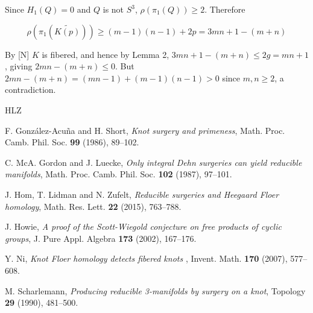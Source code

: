 \documentclass[12pt]{amsart}
\begin{document}
  Since $H_1(Q) = 0$ and $Q$ is not $S^3$,  $\rho(\pi_1(Q)) \ge 2$. Therefore

  $$\rho(\pi_1(\widetilde{K(p)})) \ge (m-1)(n-1) + 2p = 3mn + 1 - (m + n)$$
  \medskip
  
  By [N] $K$ is fibered, and hence by Lemma 2, $3mn + 1 - (m + n) \le 2g = mn + 1$, giving $2mn - (m + n) \le 0$. But $2mn - (m + n) = (mn - 1) + (m - 1)(n - 1) > 0$ since $m,n \ge 2$, a contradiction.

\bigskip
 
 
\begin{thebibliography}{HLZ}


F. Gonz\'alez-Acu\~na and H. Short, {\em Knot surgery and primeness}, Math. Proc. Camb. Phil. Soc. {\bf 99} (1986), 89--102.

C. McA. Gordon and J. Luecke, {\em Only integral Dehn surgeries can yield reducible manifolds}, Math. Proc. Camb. Phil. Soc. {\bf 102} (1987), 97--101. 

  J. Hom, T. Lidman and N. Zufelt, {\em Reducible surgeries and Heegaard Floer homology}, Math. Res. Lett. {\bf 22} (2015), 763--788.

  J. Howie, {\em A proof of the Scott-Wiegold conjecture on free products of cyclic groups}, J. Pure Appl. Algebra {\bf 173} (2002), 167--176.

 Y. Ni, {\em Knot Floer homology detects fibered knots }, Invent. Math. {\bf 170} (2007), 577--608.

 M. Scharlemann, {\em Producing reducible 3-manifolds by surgery on a knot}, Topology {\bf 29} (1990), 481--500. 

\end{thebibliography}
\end{document}
